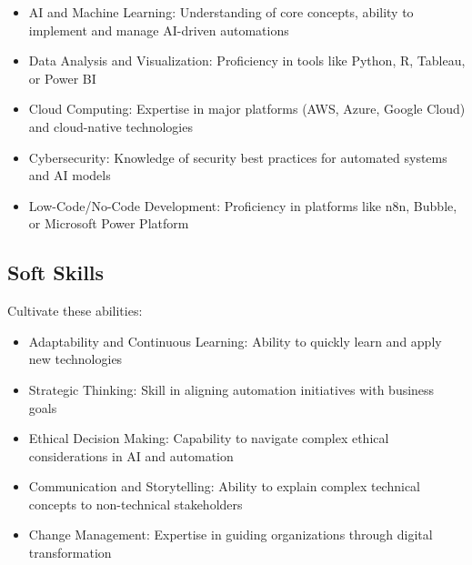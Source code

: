 \begin{itemize}
    \item AI and Machine Learning: Understanding of core concepts, ability to implement and manage AI-driven automations
    \item Data Analysis and Visualization: Proficiency in tools like Python, R, Tableau, or Power BI
    \item Cloud Computing: Expertise in major platforms (AWS, Azure, Google Cloud) and cloud-native technologies
    \item Cybersecurity: Knowledge of security best practices for automated systems and AI models
    \item Low-Code/No-Code Development: Proficiency in platforms like n8n, Bubble, or Microsoft Power Platform
\end{itemize}

\subsection{Soft Skills}

Cultivate these abilities:

\begin{itemize}
    \item Adaptability and Continuous Learning: Ability to quickly learn and apply new technologies
    \item Strategic Thinking: Skill in aligning automation initiatives with business goals
    \item Ethical Decision Making: Capability to navigate complex ethical considerations in AI and automation
    \item Communication and Storytelling: Ability to explain complex technical concepts to non-technical stakeholders
    \item Change Management: Expertise in guiding organizations through digital transformation
\end{itemize}

